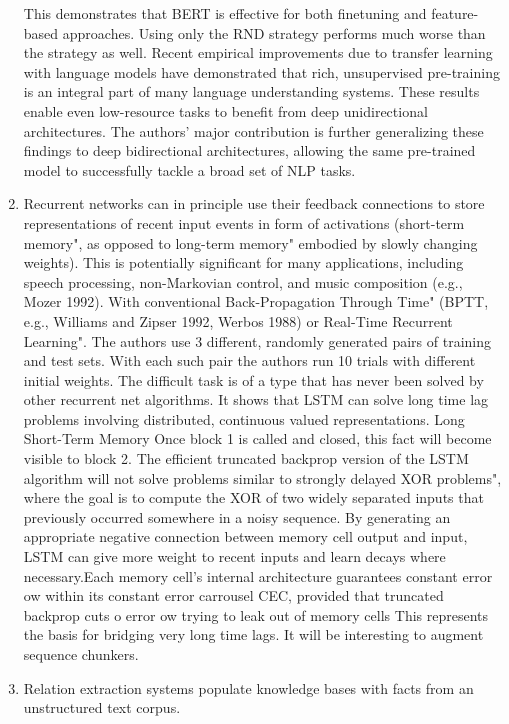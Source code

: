 \documentclass[11pt]{article}
\begin{document}
\begin{enumerate}
    This demonstrates that BERT is effective for both finetuning and feature-based approaches.
    Using only the RND strategy performs much worse than the strategy as well. Recent empirical improvements due to transfer learning with language models have demonstrated that rich, unsupervised pre-training is an integral part of many language understanding systems.
    These results enable even low-resource tasks to benefit from deep unidirectional architectures.
    The authors' major contribution is further generalizing these findings to deep bidirectional architectures, allowing the same pre-trained model to successfully tackle a broad set of NLP tasks.\cite{bert}
    \item Recurrent networks can in principle use their feedback connections to store representations of recent input events in form of activations (short-term memory", as opposed to long-term memory" embodied by slowly changing weights).
    This is potentially significant for many applications, including speech processing, non-Markovian control, and music composition (e.g., Mozer 1992).
    With conventional Back-Propagation Through Time" (BPTT, e.g., Williams and Zipser 1992, Werbos 1988) or Real-Time Recurrent Learning". The authors use 3 different, randomly generated pairs of training and test sets. With each such pair the authors run 10 trials with different initial weights. The difficult task is of a type that has never been solved by other recurrent net algorithms. It shows that LSTM can solve long time lag problems involving distributed, continuous valued representations.
    Long Short-Term Memory
    Once block 1 is called and closed, this fact will become visible to block 2. The efficient truncated backprop version of the LSTM algorithm will not solve problems similar to strongly delayed XOR problems", where the goal is to compute the XOR of two widely separated inputs that previously occurred somewhere in a noisy sequence.
    By generating an appropriate negative connection between memory cell output and input, LSTM can give more weight to recent inputs and learn decays where necessary.Each memory cell's internal architecture guarantees constant error ow within its constant error carrousel CEC, provided that truncated backprop cuts o error ow trying to leak out of memory cells
    This represents the basis for bridging very long time lags.
    It will be interesting to augment sequence chunkers. \cite{schmid}
    \item  Relation extraction systems populate knowledge bases with facts from an unstructured text corpus.

\end{enumerate}
\end{document}
